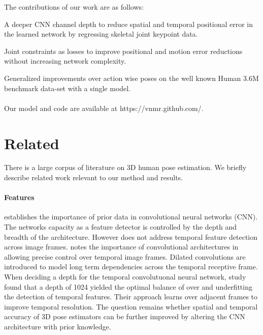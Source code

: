 \documentclass[runningheads]{llncs}
\begin{document}
The contributions of our work are as follows:

 A deeper CNN channel depth to reduce spatial and temporal positional error in the learned network by regressing skeletal joint keypoint data.

 Joint constraints as losses to improve positional and motion error reductions without increasing network complexity.

 Generalized improvements over action wise poses on the well known Human 3.6M benchmark data-set with a single model.
\\\\
Our model and code are available at https://vnmr.github.com/.

\section{Related}


There is a large corpus of literature on 3D human pose estimation. We briefly describe related work relevant to our method and results.

\iffalse
Goal: Computer Vision 3D Temporal Pose estimation:
1. Detect visual features in static images
  - CNN - priors + data
  - no temporal feature detection
2. Detect poses in static images
  1. Feature Engineering
    - require prior knowledge
  2. End to end CNN DL
    - rely on pixel data only
3. Detect temporal features across images
  - 2d stage
  - Smoothness
  - some use multi-view
  - some are end to end pixel
\fi

\paragraph {Features}

\cite{krizhevsky2012imagenet} establishes the importance of prior data in convolutional neural networks (CNN). The networks capacity as a feature detector is controlled by the depth and breadth of the architecture. However \cite{krizhevsky2012imagenet} does not address temporal feature detection across image frames. \cite{pavllo20193d} notes the importance of convolutional architectures in allowing precise control over temporal image frames. Dilated convolutions are introduced to model long term dependencies across the temporal receptive frame. When deciding a depth for the temporal convolutuonal neural network, \cite{pavllo20193d} study found that a depth of 1024 yielded the optimal balance of over and underfitting the detection of temporal features. Their approach learns over adjacent frames to improve temporal resolution. The question remains whether spatial and temporal accuracy of 3D pose estimators can be further improved by altering the CNN architecture with prior knowledge.
\end{document}
